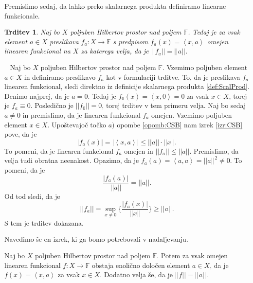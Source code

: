 \documentclass[12pt,a4paper,oneside,fleqn,openany]{book}
\newtheorem{trditev}[izrek]{Trditev}
\newcommand{\eopf}{\raisebox{0.8ex}{\framebox{}}} %
\newenvironment{dokaz}%
{\noindent{\bf Dokaz.}\ }%
{\hfill\eopf\par\bigskip}%
\newcommand{\F}{\mathbb{F}}
\newcommand{\abs}[1]{\ensuremath{\lvert #1 \rvert}}
\newcommand{\norm}[1]{\abs{\abs{#1}}}
\newcommand{\Sp}[2]{\ensuremath{\left<#1, #2\right>}}
\newcommand{\map}[3]{\ensuremath{{#1}:{#2}\rightarrow{#3}}}
\begin{document}
Premislimo sedaj, da lahko preko skalarnega produkta definiramo linearne funkcionale.
\begin{trditev}
	\label{trd:linfunsp}
	Naj bo $X$ poljuben Hilbertov prostor nad poljem $\F$. Tedaj je za vsak element $a\in X$ preslikava $\map{f_a}{X}{\F}$ s predpisom $f_a(x)=\Sp{x}{a}$ omejen linearen funkcional na $X$ za katerega velja, da je $\norm{f_a}=\norm{a}$.
\end{trditev}
\begin{dokaz}
	Naj bo $X$ poljuben Hilbertov prostor nad poljem $\F$. Vzemimo poljuben element $a\in X$ in definiramo preslikavo $f_a$ kot v formulaciji trditve. To, da je preslikava $f_a$ linearen funkcional, sledi direktno iz definicije skalarnega produkta \ref{def:ScalProd}. Denimo najprej, da je $a=0$. Tedaj je $f_0(x) = \Sp{x}{0}=0$ za vsak $x\in X$, torej je $f_a\equiv 0$. Posledično je $\norm{f_0}=0$, torej trditev v tem primeru velja. Naj bo sedaj $a\neq 0$ in premislimo, da je linearen funkcional $f_a$ omejen. Vzemimo poljuben element $x\in X$. Upoštevajoč točko $a)$ opombe \ref{opomb:CSB} nam izrek \ref{izr:CSB} pove, da je $$\abs{f_a(x)}=\abs{\Sp{x}{a}}\leq\norm{a}\cdot\norm{x}.$$ To pomeni, da je linearen funkcional $f_a$ omejen in $\norm{f_a}\leq \norm{a}$. Premislimo, da velja tudi obratna neenakost. Opazimo, da je $f_a(a)=\Sp{a}{a}=\norm{a}^2\neq 0$. To pomeni, da je $$\frac{\abs{f_a(a)}}{\norm{a}}=\norm{a}.$$ Od tod sledi, da je $$\norm{f_a}=\sup_{x\neq 0}\{\frac{\abs{f_a(x)}}{\norm{x}}\}\geq \norm{a}.$$ S tem je trditev dokazana.
\end{dokaz}
Navedimo še en izrek, ki ga bomo potrebovali v nadaljevanju.
\begin{izrek}[Riesz]
	\label{izr:Riesz}
	Naj bo $X$ poljuben Hilbertov prostor nad poljem $\F$. Potem za vsak omejen linearen funkcional $\map{f}{X}{\F}$ obstaja enolično določen element $a\in X$, da je $f(x) = \Sp{x}{a}$ za vsak $x\in X$. Dodatno velja še, da je $\norm{f} = \norm{a}$.
\end{izrek}
\end{document}
